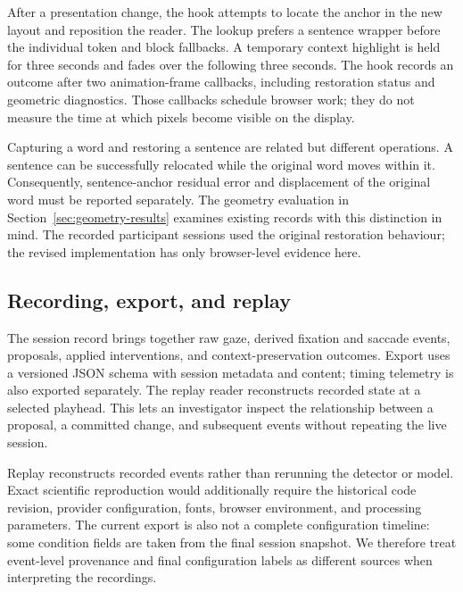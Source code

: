 After a presentation change, the hook attempts to locate the anchor in the new layout and reposition the reader. The lookup prefers a sentence wrapper before the individual token and block fallbacks. A temporary context highlight is held for three seconds and fades over the following three seconds. The hook records an outcome after two animation-frame callbacks, including restoration status and geometric diagnostics. Those callbacks schedule browser work; they do not measure the time at which pixels become visible on the display.

Capturing a word and restoring a sentence are related but different operations. A sentence can be successfully relocated while the original word moves within it. Consequently, sentence-anchor residual error and displacement of the original word must be reported separately. The geometry evaluation in Section~\ref{sec:geometry-results} examines existing records with this distinction in mind. The recorded participant sessions used the original restoration behaviour; the revised implementation has only browser-level evidence here.

\subsection{Recording, export, and replay}

The session record brings together raw gaze, derived fixation and saccade events, proposals, applied interventions, and context-preservation outcomes. Export uses a versioned JSON schema with session metadata and content; timing telemetry is also exported separately. The replay reader reconstructs recorded state at a selected playhead. This lets an investigator inspect the relationship between a proposal, a committed change, and subsequent events without repeating the live session.

Replay reconstructs recorded events rather than rerunning the detector or model. Exact scientific reproduction would additionally require the historical code revision, provider configuration, fonts, browser environment, and processing parameters. The current export is also not a complete configuration timeline: some condition fields are taken from the final session snapshot. We therefore treat event-level provenance and final configuration labels as different sources when interpreting the recordings.
